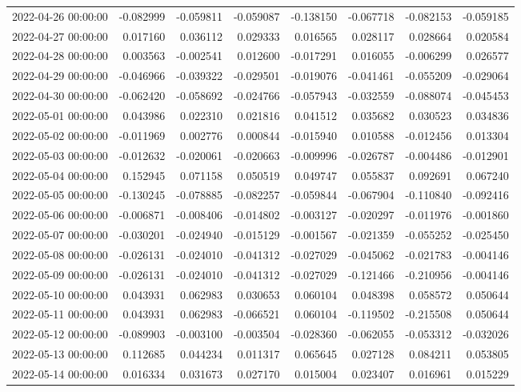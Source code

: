 \begin{tabular}{lrrrrrrr}
2022-04-26 00:00:00 & -0.082999 & -0.059811 & -0.059087 & -0.138150 & -0.067718 & -0.082153 & -0.059185 \\
2022-04-27 00:00:00 & 0.017160 & 0.036112 & 0.029333 & 0.016565 & 0.028117 & 0.028664 & 0.020584 \\
2022-04-28 00:00:00 & 0.003563 & -0.002541 & 0.012600 & -0.017291 & 0.016055 & -0.006299 & 0.026577 \\
2022-04-29 00:00:00 & -0.046966 & -0.039322 & -0.029501 & -0.019076 & -0.041461 & -0.055209 & -0.029064 \\
2022-04-30 00:00:00 & -0.062420 & -0.058692 & -0.024766 & -0.057943 & -0.032559 & -0.088074 & -0.045453 \\
2022-05-01 00:00:00 & 0.043986 & 0.022310 & 0.021816 & 0.041512 & 0.035682 & 0.030523 & 0.034836 \\
2022-05-02 00:00:00 & -0.011969 & 0.002776 & 0.000844 & -0.015940 & 0.010588 & -0.012456 & 0.013304 \\
2022-05-03 00:00:00 & -0.012632 & -0.020061 & -0.020663 & -0.009996 & -0.026787 & -0.004486 & -0.012901 \\
2022-05-04 00:00:00 & 0.152945 & 0.071158 & 0.050519 & 0.049747 & 0.055837 & 0.092691 & 0.067240 \\
2022-05-05 00:00:00 & -0.130245 & -0.078885 & -0.082257 & -0.059844 & -0.067904 & -0.110840 & -0.092416 \\
2022-05-06 00:00:00 & -0.006871 & -0.008406 & -0.014802 & -0.003127 & -0.020297 & -0.011976 & -0.001860 \\
2022-05-07 00:00:00 & -0.030201 & -0.024940 & -0.015129 & -0.001567 & -0.021359 & -0.055252 & -0.025450 \\
2022-05-08 00:00:00 & -0.026131 & -0.024010 & -0.041312 & -0.027029 & -0.045062 & -0.021783 & -0.004146 \\
2022-05-09 00:00:00 & -0.026131 & -0.024010 & -0.041312 & -0.027029 & -0.121466 & -0.210956 & -0.004146 \\
2022-05-10 00:00:00 & 0.043931 & 0.062983 & 0.030653 & 0.060104 & 0.048398 & 0.058572 & 0.050644 \\
2022-05-11 00:00:00 & 0.043931 & 0.062983 & -0.066521 & 0.060104 & -0.119502 & -0.215508 & 0.050644 \\
2022-05-12 00:00:00 & -0.089903 & -0.003100 & -0.003504 & -0.028360 & -0.062055 & -0.053312 & -0.032026 \\
2022-05-13 00:00:00 & 0.112685 & 0.044234 & 0.011317 & 0.065645 & 0.027128 & 0.084211 & 0.053805 \\
2022-05-14 00:00:00 & 0.016334 & 0.031673 & 0.027170 & 0.015004 & 0.023407 & 0.016961 & 0.015229 \\

\end{tabular}
